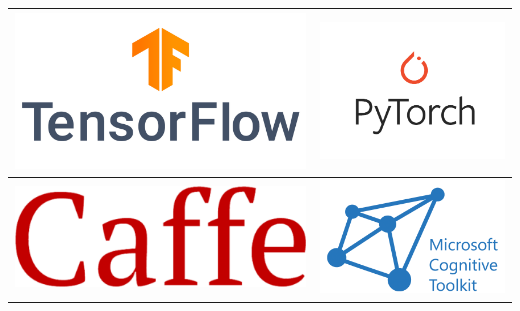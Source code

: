 \documentclass{beamer}
\begin{document}
\begin{frame}
    \begin{table}[]
        \centering
        \begin{tabular}{c|c}
                \includegraphics[scale=0.1]{tf-logo-vertical.png}
 &      \includegraphics[scale=0.15]{pytorch-logo-vertical.png}
\\
\hline
            \includegraphics[scale=0.15]{caffe-logo.png}
     &     \includegraphics[scale=0.2]{cntk-logo.png}

\end{tabular}
\end{table}
\end{frame}
\end{document}
